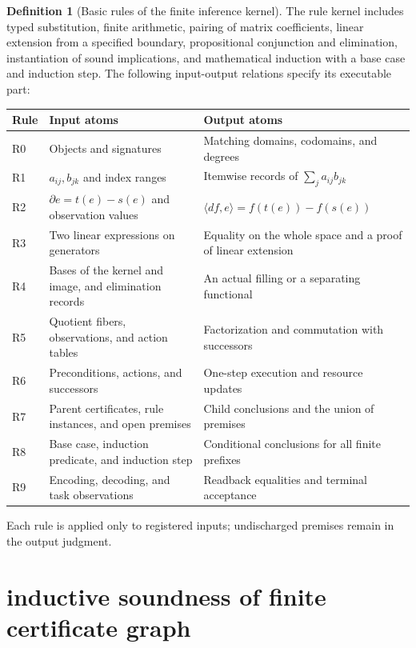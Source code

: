 \documentclass[12pt,a4paper,openany,notitlepage]{report}
\theoremstyle{plain}
\theoremstyle{definition}
\newtheorem{definition}[theorem]{Definition}
\theoremstyle{remark}
\begin{document}
\begin{CJK*}
\begin{definition} [Basic rules of the finite inference kernel]
\label{hgov:def:kernel}
The rule kernel includes typed substitution, finite arithmetic, pairing of matrix coefficients, linear extension from a specified boundary, propositional conjunction and elimination, instantiation of sound implications, and mathematical induction with a base case and induction step. The following input-output relations specify its executable part:
\begin{center} \small
\begin{tabularx} {\textwidth} {P{.12\textwidth}YY}
\toprule
Rule & Input atoms & Output atoms \\
\midrule
R0 & Objects and signatures & Matching domains, codomains, and degrees \\
R1 & $a_{ij},b_{jk}$ and index ranges & Itemwise records of $\sum_j a_{ij}b_{jk}$ \\
R2 & $\partial e=t(e)-s(e)$ and observation values & $\langle df,e\rangle=f(t(e))-f(s(e))$ \\
R3 & Two linear expressions on generators & Equality on the whole space and a proof of linear extension \\
R4 & Bases of the kernel and image, and elimination records & An actual filling or a separating functional \\
R5 & Quotient fibers, observations, and action tables & Factorization and commutation with successors \\
R6 & Preconditions, actions, and successors & One-step execution and resource updates \\
R7 & Parent certificates, rule instances, and open premises & Child conclusions and the union of premises \\
R8 & Base case, induction predicate, and induction step & Conditional conclusions for all finite prefixes \\
R9 & Encoding, decoding, and task observations & Readback equalities and terminal acceptance \\
\bottomrule
\end{tabularx}
\end{center}
Each rule is applied only to registered inputs; undischarged premises remain in the output judgment.
\end{definition}

\section { inductive soundness of finite certificate graph }


\end{CJK*}
\end{document}
